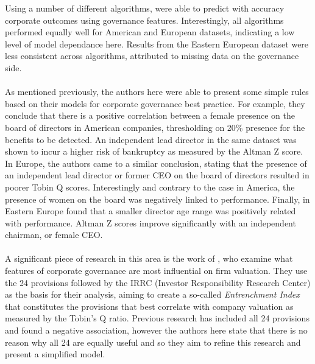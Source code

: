 {{Using a number of different algorithms, \cite{moldovan2015learning} were able to predict with accuracy corporate outcomes using governance features. Interestingly, all algorithms performed equally well for American and European datasets, indicating a low level of model dependance here. Results from the Eastern European dataset were less consistent across algorithms, attributed to missing data on the governance side.\\\\
As mentioned previously, the authors here were able to present some simple rules based on their models for corporate governance best practice. For example, they conclude that there is a positive correlation between a female presence on the board of directors in American companies, thresholding on 20\% presence for the benefits to be detected. An independent lead director in the same dataset was shown to incur a higher risk of bankruptcy as measured by the Altman Z score. In Europe, the authors came to a similar conclusion, stating that the presence of an independent lead director or former CEO on the board of directors resulted in poorer Tobin Q scores. Interestingly and contrary to the case in America, the presence of women on the board was negatively linked to performance. Finally, in Eastern Europe \cite{moldovan2015learning} found that a smaller director age range was positively related with performance. Altman Z scores improve significantly with an independent chairman, or female CEO. \\\\
A significant piece of research in this area is the work of \cite{bebchukWhatMatters}, who examine what features of corporate governance are most influential on firm valuation. They use the 24 provisions followed by the IRRC (Investor Responsibility Research Center) as the basis for their analysis, aiming to create a so-called {\it Entrenchment Index} that constitutes the provisions that best correlate with company valuation as measured by the Tobin's Q ratio. Previous research has included all 24 provisions and found a negative association, however the authors here state that there is no reason why all 24 are equally useful and so they aim to refine this research and present a simplified model. \\\\
}}
